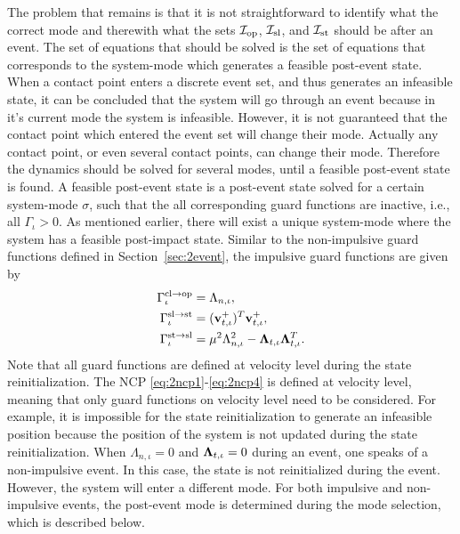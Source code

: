 \documentclass[../DC2017114Bouma.tex]{subfiles}
\begin{document}
The problem that remains is that it is not straightforward to identify what the correct mode and therewith what the sets $\mathcal{I}_{\textnormal{op}}$, $\mathcal{I}_{\textnormal{sl}}$, and $\mathcal{I}_{\textnormal{st}}$ should be after an event. The set of equations that should be solved is the set of equations that corresponds to the system-mode which generates a feasible post-event state. When a contact point enters a discrete event set, and thus generates an infeasible state, it can be concluded that the system will go through an event because in it's current mode the system is infeasible. However, it is not guaranteed that the contact point which entered the event set will change their mode. Actually any contact point, or even several contact points, can change their mode. Therefore the dynamics should be solved for several modes, until a feasible post-event state is found. A feasible post-event state is a post-event state solved for a certain system-mode $\sigma$, such that the all corresponding guard functions are inactive, i.e., all $\Gamma_{\iota}>0$. As mentioned earlier, there will exist a unique system-mode where the system has a feasible post-impact state. Similar to the non-impulsive guard functions defined in Section~\ref{sec:2event}, the impulsive guard functions are given by
\begin{align}
\Gamma^{\text{cl}\rightarrow\text{op}}_{\iota} &= \Lambda_{n,\iota},\\
\Gamma^{\text{sl}\rightarrow\text{st}}_{\iota} &= (\mathbf{v}^+_{t,\iota})^T\mathbf{v}^+_{t,\iota},\\
\Gamma^{\text{st}\rightarrow\text{sl}}_{\iota} &= \mu^2\Lambda_{n,\iota}^2 - \boldsymbol{\Lambda}_{t,\iota}\boldsymbol{\Lambda}_{t,\iota}^T.
\end{align}
Note that all guard functions are defined at velocity level during the state reinitialization. The NCP \eqref{eq:2ncp1}-\eqref{eq:2ncp4} is defined at velocity level, meaning that only guard functions on velocity level need to be considered. For example, it is impossible for the state reinitialization to generate an infeasible position because the position of the system is not updated during the state reinitialization. When $\Lambda_{n,\iota} = 0$ and $\boldsymbol{\Lambda}_{t,\iota} = 0$ during an event, one speaks of a non-impulsive event. In this case, the state is not reinitialized during the event. However, the system will enter a different mode. For both impulsive and non-impulsive events, the post-event mode is determined during the mode selection, which is described below.
\end{document}
